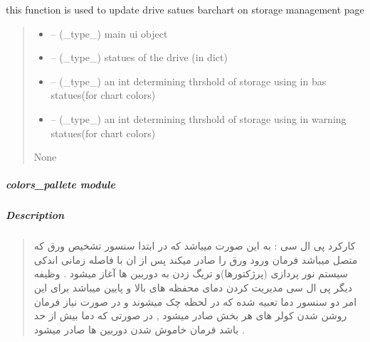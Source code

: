 \documentclass[letterpaper,10pt,english]{sphinxmanual}
\begin{document}
\begin{savenotes}\begin{fulllineitems}
\label{\detokenize{setting/backend/chart_funcs:oxin.backend.chart_funcs.update_drive_barchart}}
\pysigstartsignatures
{}
\pysigstopsignatures
\sphinxAtStartPar
this function is used to update drive satues barchart on storage management page
\begin{quote}\begin{description}
\begin{itemize}
\item {} 
\sphinxAtStartPar
{} – (\_type\_) main ui object

\item {} 
\sphinxAtStartPar
{} – (\_type\_) statues of the drive (in dict)

\item {} 
\sphinxAtStartPar
{} – (\_type\_) an int determining thrshold of storage using in bas statues(for chart colors)

\item {} 
\sphinxAtStartPar
{} – (\_type\_) an int determining thrshold of storage using in warning statues(for chart colors)

\end{itemize}

\sphinxAtStartPar
None

\end{description}\end{quote}

\end{fulllineitems}\end{savenotes}


\sphinxstepscope


\subparagraph{colors\_pallete module}
\label{\detokenize{setting/backend/colors_pallete:colors-pallete-module}}\label{\detokenize{setting/backend/colors_pallete::doc}}

\subparagraph{Description}
\label{\detokenize{setting/backend/colors_pallete:description}}\begin{quote}

\sphinxAtStartPar
کارکرد پی ال سی : به این صورت میباشد که در ابتدا سنسور تشخیص ورق که متصل میباشد فرمان ورود ورق را صادر میکند پس از ان با فاصله زمانی اندکی سیستم نور پردازی (پرژکتورها)و تریگ زدن به دوربین ها آغاز میشود . وظیفه دیگر پی ال سی مدیریت کردن دمای محفظه های بالا و پایین میباشد برای این امر دو سنسور دما تعبیه شده که در لحظه چک میشوند و در صورت نیاز فرمان روشن شدن کولر های هر بخش صادر میشود , در صورتی که دما بیش از حد باشد فرمان خاموش شدن دوربین ها صادر میشود .
\end{quote}
\end{document}

